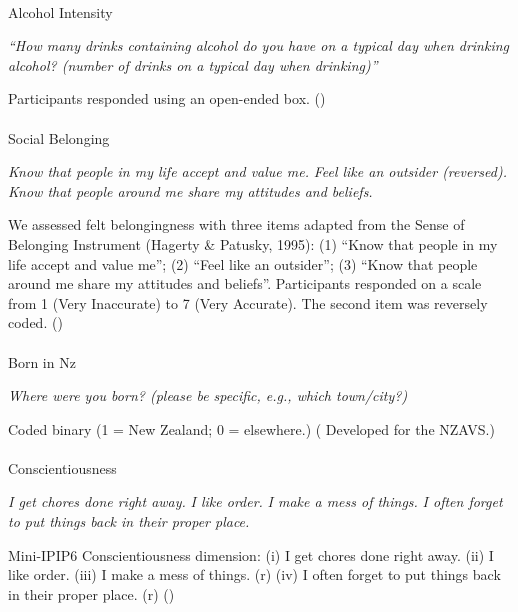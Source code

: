 \documentclass[
  single column]{article}
\makeatletter
\let\oldparagraph\paragraph
\renewcommand{\paragraph}{
    \@ifstar
      \xxxParagraphStar
      \xxxParagraphNoStar
  }
\newcommand{\xxxParagraphStar}[1]{\oldparagraph*{#1}\mbox{}}
\newcommand{\xxxParagraphNoStar}[1]{\oldparagraph{#1}\mbox{}}
\makeatother
\begin{document}
\paragraph{Alcohol Intensity}\label{alcohol-intensity}

\emph{``How many drinks containing alcohol do you have on a typical day
when drinking alcohol? (number of drinks on a typical day when
drinking)''}

Participants responded using an open-ended box.
()

\paragraph{Social Belonging}\label{social-belonging}

\emph{Know that people in my life accept and value me.} \emph{Feel like
an outsider (reversed).} \emph{Know that people around me share my
attitudes and beliefs.}

We assessed felt belongingness with three items adapted from the Sense
of Belonging Instrument (Hagerty \& Patusky, 1995): (1) ``Know that
people in my life accept and value me''; (2) ``Feel like an outsider'';
(3) ``Know that people around me share my attitudes and beliefs''.
Participants responded on a scale from 1 (Very Inaccurate) to 7 (Very
Accurate). The second item was reversely coded.
()

\paragraph{Born in Nz}\label{born-in-nz}

\emph{Where were you born? (please be specific, e.g., which town/city?)}

Coded binary (1 = New Zealand; 0 = elsewhere.)
( Developed for the
NZAVS.)

\paragraph{Conscientiousness}\label{conscientiousness}

\emph{I get chores done right away.} \emph{I like order.} \emph{I make a
mess of things.} \emph{I often forget to put things back in their proper
place.}

Mini-IPIP6 Conscientiousness dimension: (i) I get chores done right
away. (ii) I like order. (iii) I make a mess of things. (r) (iv) I often
forget to put things back in their proper place. (r)
()
\end{document}
